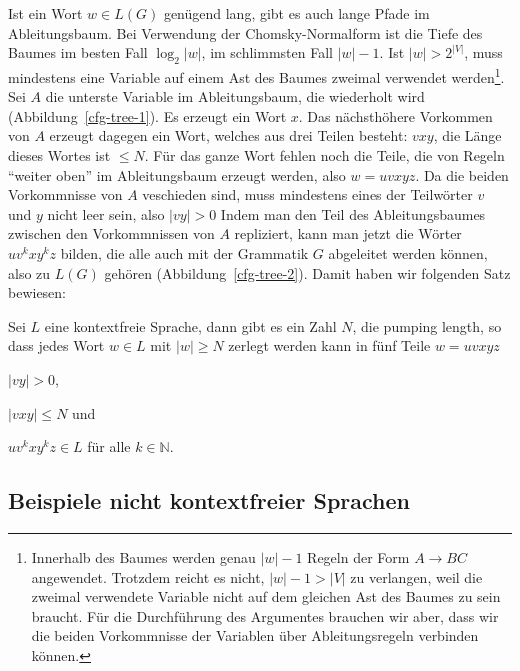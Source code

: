 Ist ein Wort $w\in L(G)$ genügend lang, gibt es auch lange Pfade im
Ableitungsbaum. Bei Verwendung der Chomsky-Normalform ist die 
Tiefe des Baumes im besten Fall $\log_2 |w|$, im schlimmsten Fall $|w|-1$.
Ist $|w|>2^{|V|}$, muss mindestens eine
Variable auf einem Ast des Baumes zweimal verwendet werden\footnote{
Innerhalb des Baumes werden genau $|w|-1$ Regeln der
Form $A\to BC$ angewendet.
Trotzdem reicht es nicht, $|w|-1>|V|$ zu verlangen, weil die
zweimal verwendete Variable nicht auf dem gleichen Ast des
Baumes zu sein braucht. Für die Durchführung des Argumentes
brauchen wir aber, dass wir die beiden Vorkommnisse der Variablen
über Ableitungsregeln verbinden können.}.
Sei $A$ die unterste Variable im Ableitungsbaum, die wiederholt
wird (Abbildung~\ref{cfg-tree-1}).
Es erzeugt ein Wort $x$. Das nächsthöhere Vorkommen von $A$
erzeugt dagegen ein Wort, welches aus drei Teilen besteht:
$vxy$, die Länge dieses Wortes ist $\le N$. Für das ganze Wort fehlen
noch die Teile, die von Regeln ``weiter oben'' im Ableitungsbaum
erzeugt werden, also $w=uvxyz$.
Da die beiden Vorkommnisse von $A$ veschieden sind, muss mindestens
eines der Teilwörter $v$ und $y$ nicht leer sein, also $|vy|>0$
Indem man den Teil des Ableitungsbaumes
zwischen den Vorkommnissen von $A$ repliziert, kann man jetzt die
Wörter $uv^kxy^kz$ bilden, die alle auch mit der Grammatik $G$ 
abgeleitet werden können, also zu $L(G)$ gehören (Abbildung~\ref{cfg-tree-2}).
Damit haben wir folgenden Satz bewiesen:

\begin{satz}
%
%
Sei $L$ eine kontextfreie Sprache, dann gibt es ein Zahl $N$, die pumping
length, so dass jedes Wort $w\in L$ mit $|w|\ge N$ zerlegt werden
kann in fünf Teile $w=uvxyz$
\begin{compactenum}
\item
$|vy|>0$,
\item
$|vxy|\le N$ und
\item
$uv^kxy^kz\in L$ für alle $k\in\mathbb N$.
\end{compactenum}
\end{satz}

\subsection{Beispiele nicht kontextfreier Sprachen}
